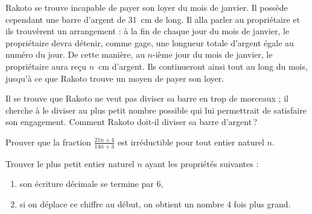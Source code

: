 \begin{exo}
		Rakoto se trouve incapable de payer son loyer du mois de janvier.
		Il poss\`ede cependant une barre d'argent de 31~cm de long.
		Il alla parler au propri\'etaire et ils trouv\`erent un arrangement :
		\`a la fin de chaque jour du mois de janvier, le propri\'etaire devra d\'etenir, comme gage,
		une longueur totale d'argent \'egale au num\'ero du jour.
	De cette mani\`ere, au $n$-ième jour du mois de janvier, le propri\'etaire aura re\c{c}u $n$~cm d'argent.
		Ils continueront ainsi tout au long du mois, jusqu'\`a ce que Rakoto trouve un moyen de payer son loyer.
	
		Il se trouve que Rakoto ne veut pas diviser sa barre en trop de morceaux ;
	il cherche \`a le diviser au plus petit nombre possible qui lui permettrait de satisfaire son engagement.
		Comment Rakoto doit-il diviser sa barre d'argent\,?
%	
\end{exo}

\begin{exo}[IMO 1959 1.]
		Prouver que la fraction $\frac{21n+4}{14n+3}$ est irr\'eductible pour tout entier naturel $n$.
\end{exo}

\begin{exo}[IMO 1962 1.]
	Trouver le plus petit entier naturel $n$ ayant les propri\'et\'es suivantes :
	\begin{enumerate}
			\item son \'ecriture d\'ecimale se termine par $6$,
		\item si on d\'eplace ce chiffre au d\'ebut, on obtient un nombre 4 fois plus grand.
	\end{enumerate}
\end{exo}

